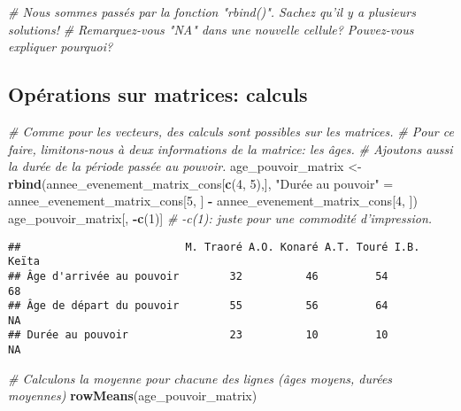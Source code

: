 \documentclass[]{book}
\newenvironment{Shaded}{\begin{snugshade}}{\end{snugshade}}
\newcommand{\KeywordTok}[1]{\textcolor[rgb]{0.13,0.29,0.53}{\textbf{#1}}}
\newcommand{\DecValTok}[1]{\textcolor[rgb]{0.00,0.00,0.81}{#1}}
\newcommand{\StringTok}[1]{\textcolor[rgb]{0.31,0.60,0.02}{#1}}
\newcommand{\CommentTok}[1]{\textcolor[rgb]{0.56,0.35,0.01}{\textit{#1}}}
\newcommand{\OperatorTok}[1]{\textcolor[rgb]{0.81,0.36,0.00}{\textbf{#1}}}
\newcommand{\NormalTok}[1]{#1}
\begin{document}
\begin{Shaded}
\begin{Highlighting}[]
\CommentTok{# Nous sommes passés par la fonction "rbind()". Sachez qu'il y a plusieurs solutions!}
\CommentTok{# Remarquez-vous "NA" dans une nouvelle cellule? Pouvez-vous expliquer pourquoi?}
\end{Highlighting}
\end{Shaded}

\normalsize

\subsection{Opérations sur matrices:
calculs}\label{operations-sur-matrices-calculs}

\tiny

\begin{Shaded}
\begin{Highlighting}[]
\CommentTok{# Comme pour les vecteurs, des calculs sont possibles sur les matrices.}
\CommentTok{# Pour ce faire, limitons-nous à deux informations de la matrice: les âges.}
\CommentTok{# Ajoutons aussi la durée de la période passée au pouvoir.}
\NormalTok{age_pouvoir_matrix <-}\StringTok{ }\KeywordTok{rbind}\NormalTok{(annee_evenement_matrix_cons[}\KeywordTok{c}\NormalTok{(}\DecValTok{4}\NormalTok{, }\DecValTok{5}\NormalTok{),],}
                            \StringTok{"Durée au pouvoir"}\NormalTok{ =}\StringTok{ }\NormalTok{annee_evenement_matrix_cons[}\DecValTok{5}\NormalTok{, ] }\OperatorTok{-}\StringTok{ }
\StringTok{                              }\NormalTok{annee_evenement_matrix_cons[}\DecValTok{4}\NormalTok{, ])}
\NormalTok{age_pouvoir_matrix[, }\OperatorTok{-}\KeywordTok{c}\NormalTok{(}\DecValTok{1}\NormalTok{)] }\CommentTok{# -c(1): juste pour une commodité d'impression.}
\end{Highlighting}
\end{Shaded}

\begin{verbatim}
##                          M. Traoré A.O. Konaré A.T. Touré I.B. Keïta
## Âge d'arrivée au pouvoir        32          46         54         68
## Âge de départ du pouvoir        55          56         64         NA
## Durée au pouvoir                23          10         10         NA
\end{verbatim}

\begin{Shaded}
\begin{Highlighting}[]
\CommentTok{# Calculons la moyenne pour chacune des lignes (âges moyens, durées moyennes)}
\KeywordTok{rowMeans}\NormalTok{(age_pouvoir_matrix)}
\end{Highlighting}
\end{Shaded}
\end{document}

